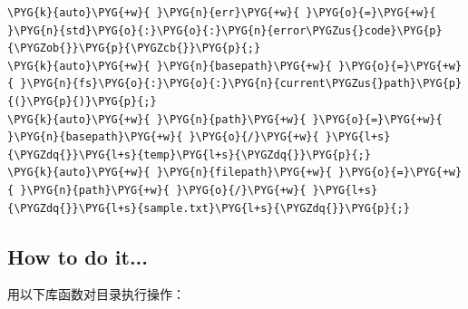 \begin{codeblockbg}
\begin{Verbatim}[commandchars=\\\{\},breaklines=true,breakanywhere=true,fontsize=\codefont,xleftmargin=17bp]
\PYG{k}{auto}\PYG{+w}{ }\PYG{n}{err}\PYG{+w}{ }\PYG{o}{=}\PYG{+w}{ }\PYG{n}{std}\PYG{o}{:}\PYG{o}{:}\PYG{n}{error\PYGZus{}code}\PYG{p}{\PYGZob{}}\PYG{p}{\PYGZcb{}}\PYG{p}{;}
\PYG{k}{auto}\PYG{+w}{ }\PYG{n}{basepath}\PYG{+w}{ }\PYG{o}{=}\PYG{+w}{ }\PYG{n}{fs}\PYG{o}{:}\PYG{o}{:}\PYG{n}{current\PYGZus{}path}\PYG{p}{(}\PYG{p}{)}\PYG{p}{;}
\PYG{k}{auto}\PYG{+w}{ }\PYG{n}{path}\PYG{+w}{ }\PYG{o}{=}\PYG{+w}{ }\PYG{n}{basepath}\PYG{+w}{ }\PYG{o}{/}\PYG{+w}{ }\PYG{l+s}{\PYGZdq{}}\PYG{l+s}{temp}\PYG{l+s}{\PYGZdq{}}\PYG{p}{;}
\PYG{k}{auto}\PYG{+w}{ }\PYG{n}{filepath}\PYG{+w}{ }\PYG{o}{=}\PYG{+w}{ }\PYG{n}{path}\PYG{+w}{ }\PYG{o}{/}\PYG{+w}{ }\PYG{l+s}{\PYGZdq{}}\PYG{l+s}{sample.txt}\PYG{l+s}{\PYGZdq{}}\PYG{p}{;}
\end{Verbatim}
\end{codeblockbg}



\subsection{How to do it...}



用以下库函数对目录执行操作：



